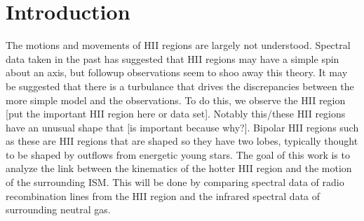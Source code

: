 \section{Introduction}

The motions and movements of HII regions are largely not understood. Spectral data taken in the past has suggested that HII regions may have a simple spin about an axis, but followup observations seem to shoo away this theory. It may be suggested that there is a turbulance that drives the discrepancies between the more simple model and the observations. To do this, we observe the HII region [put the important HII region here or data set]. Notably this/these HII regions have an unusual shape that [is important because why?]. Bipolar HII regions such as these are HII regions that are shaped so they have two lobes, typically thought to be shaped by outflows from energetic young stars. The goal of this work is to analyze the link between the kinematics of the hotter HII region and the motion of the surrounding ISM. This will be done by comparing spectral data of radio recombination lines from the HII region and the infrared spectral data of surrounding neutral gas. 
